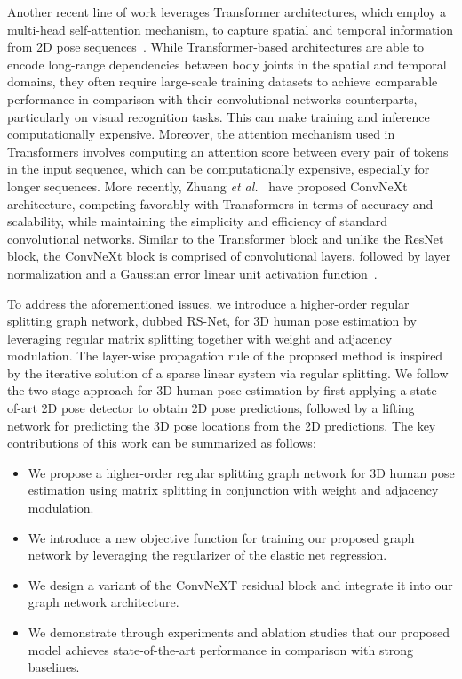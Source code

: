 \documentclass[10pt,journal]{IEEEtran}
\begin{document}
Another recent line of work leverages Transformer architectures, which employ a multi-head self-attention mechanism, to capture spatial and temporal information from 2D pose sequences~\cite{PoseFormer:2021,li2022mhformer}. While Transformer-based architectures are able to encode long-range dependencies between body joints in the spatial and temporal domains, they often require large-scale training datasets to achieve comparable performance in comparison with their convolutional networks counterparts, particularly on visual recognition tasks. This can make training and inference computationally expensive. Moreover, the attention mechanism used in Transformers involves computing an attention score between every pair of tokens in the input sequence, which can be computationally expensive, especially for longer sequences. More recently, Zhuang \emph{et al.}~\cite{liu2022convnet} have proposed ConvNeXt architecture, competing favorably with Transformers in terms of accuracy and scalability, while maintaining the simplicity and efficiency of standard convolutional networks. Similar to the Transformer block and unlike the ResNet block, the ConvNeXt block is comprised of convolutional layers, followed by layer normalization and a Gaussian error linear unit activation function~\cite{liu2022convnet}.
	
To address the aforementioned issues, we introduce a higher-order regular splitting graph network, dubbed RS-Net, for 3D human pose estimation by leveraging regular matrix splitting together with weight and adjacency modulation. The layer-wise propagation rule of the proposed method is inspired by the iterative solution of a sparse linear system via regular splitting. We follow the two-stage approach for 3D human pose estimation by first applying a state-of-art 2D pose detector to obtain 2D pose predictions, followed by a lifting network for predicting the 3D pose locations from the 2D predictions. The key contributions of this work can be summarized as follows:
	
\begin{itemize}
\item We propose a higher-order regular splitting graph network for 3D human pose estimation using matrix splitting in conjunction with weight and adjacency modulation.
\item We introduce a new objective function for training our proposed graph network by leveraging the regularizer of the elastic net regression.
\item We design a variant of the ConvNeXT residual block and integrate it into our graph network architecture.
\item We demonstrate through experiments and ablation studies that our proposed model achieves state-of-the-art performance in comparison with strong baselines.
\end{itemize}
\end{document}
